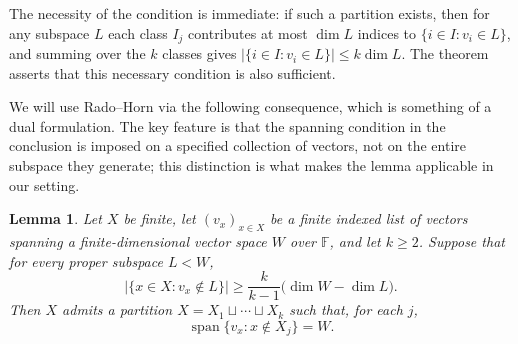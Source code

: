 \documentclass[11pt]{amsart}
\newtheorem{lemma}[theorem]{Lemma}
\newcommand{\F}{\mathbb{F}}
\DeclareMathOperator{\Span}{span}
\begin{document}
The necessity of the condition is immediate: if such a partition exists, then
for any subspace $L$ each class $I_j$ contributes at most $\dim L$ indices
to $\{i \in I : v_i \in L\}$, and summing over the $k$ classes gives
$|\{i \in I : v_i \in L\}| \leq k \dim L$.
The theorem asserts that this necessary condition is also sufficient.

We will use Rado--Horn via the following consequence, which is something of a dual formulation. The key feature is that the spanning condition in
the conclusion is imposed on a specified collection of vectors, not on the
entire subspace they generate; this distinction is what makes the lemma
applicable in our setting.

\begin{lemma}\label{lem:complement-radohorn}
Let $X$ be finite, let $(v_x)_{x\in X}$ be a finite indexed list of vectors
spanning a finite-dimensional vector space $W$ over $\F$, and let $k\geq 2$.
Suppose that for every proper subspace $L<W$,
$$
        |\{x\in X:v_x\notin L\}|
        \geq
        \frac{k}{k-1}\bigl(\dim W-\dim L\bigr).
$$
Then $X$ admits a partition $X=X_1\sqcup\cdots\sqcup X_k$ such that, for each
$j$,
$$
        \Span\{v_x:x\notin X_j\}=W.
$$
\end{lemma}
\end{document}
